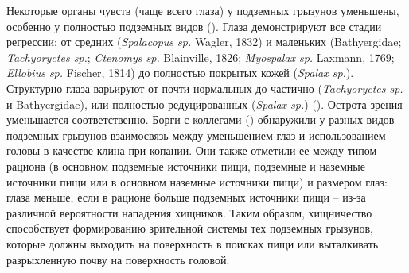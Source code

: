 
Некоторые органы чувств (чаще всего глаза) у подземных грызунов уменьшены, особенно у полностью подземных видов (\cite{REICHMAN1990}). Глаза демонстрируют все стадии регрессии: от средних (\textit{Spalacopus sp.} Wagler, 1832) и маленьких (Bathyergidae; \textit{Tachyoryctes sp.}; \textit{Ctenomys sp.} Blainville, 1826; \textit{Myospalax sp.} Laxmann, 1769; \textit{Ellobius sp.} Fischer, 1814) до полностью покрытых кожей (\textit{Spalax sp.}). Структурно глаза варьируют от почти нормальных до частично (\textit{Tachyoryctes sp.} и Bathyergidae), или полностью редуцированных (\textit{Spalax sp.}) (\cite{Nevo1990}). Острота зрения уменьшается соответственно. Борги с коллегами (\cite{Borghi2002}) обнаружили у разных видов подземных грызунов взаимосвязь между уменьшением глаз и использованием головы в качестве клина при копании. Они также отметили ее между типом рациона (в основном подземные источники пищи, подземные и наземные источники пищи или в основном наземные источники пищи) и размером глаз: глаза меньше, если в рационе больше подземных источники пищи -- из-за различной вероятности нападения хищников. Таким образом, хищничество способствует формированию зрительной системы тех подземных грызунов, которые должны выходить на поверхность в поисках пищи или выталкивать разрыхленную почву на поверхность головой.




